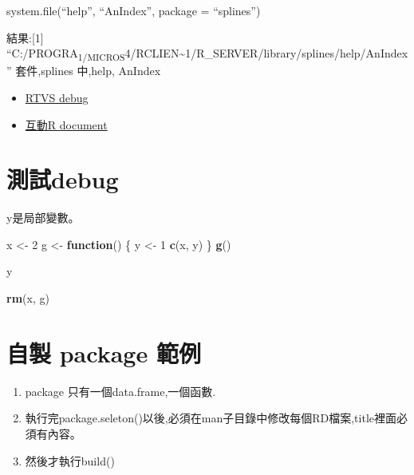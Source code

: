 \documentclass[]{book}
\newenvironment{Shaded}{\begin{snugshade}}{\end{snugshade}}
\newcommand{\KeywordTok}[1]{\textcolor[rgb]{0.13,0.29,0.53}{\textbf{#1}}}
\newcommand{\DecValTok}[1]{\textcolor[rgb]{0.00,0.00,0.81}{#1}}
\newcommand{\StringTok}[1]{\textcolor[rgb]{0.31,0.60,0.02}{#1}}
\newcommand{\ControlFlowTok}[1]{\textcolor[rgb]{0.13,0.29,0.53}{\textbf{#1}}}
\newcommand{\NormalTok}[1]{#1}
\providecommand{\tightlist}{%
  \setlength{\itemsep}{0pt}\setlength{\parskip}{0pt}}
\theoremstyle{definition}
\theoremstyle{definition}
\theoremstyle{definition}
\theoremstyle{remark}
\begin{document}
system.file(``help'', ``AnIndex'', package = ``splines'')

結果:{[}1{]}
``C:/PROGRA\textsubscript{1/MICROS}4/RCLIEN\textasciitilde{}1/R\_SERVER/library/splines/help/AnIndex''
套件,splines 中,help, AnIndex

\begin{itemize}
\tightlist
\item
  \href{https://docs.microsoft.com/zh-tw/visualstudio/rtvs/debugging-r-in-visual-studio?view=vs-2017}{RTVS
  debug}\\
\item
  \href{https://www.rdocumentation.org/packages/base/versions/3.5.1/topics/attributes}{互動R
  document}
\end{itemize}

\section{測試debug}\label{debug}

y是局部變數。

\begin{Shaded}
\begin{Highlighting}[]
\NormalTok{x <-}\StringTok{ }\DecValTok{2}
\NormalTok{g <-}\StringTok{ }\ControlFlowTok{function}\NormalTok{() \{}
\NormalTok{    y <-}\StringTok{ }\DecValTok{1}
    \KeywordTok{c}\NormalTok{(x, y)}
\NormalTok{\}}
\KeywordTok{g}\NormalTok{()}
\end{Highlighting}
\end{Shaded}

\begin{Shaded}
\begin{Highlighting}[]
\NormalTok{y}
\end{Highlighting}
\end{Shaded}

\begin{Shaded}
\begin{Highlighting}[]
\KeywordTok{rm}\NormalTok{(x, g)}
\end{Highlighting}
\end{Shaded}

\section{自製 package 範例}\label{-package-}

\begin{enumerate}
\def\labelenumi{\arabic{enumi}.}
\tightlist
\item
  package 只有一個data.frame,一個函數.\\
\item
  執行完package.seleton()以後,必須在man子目錄中修改每個RD檔案,title裡面必須有內容。\\
\item
  然後才執行build()
\end{enumerate}
\end{document}
